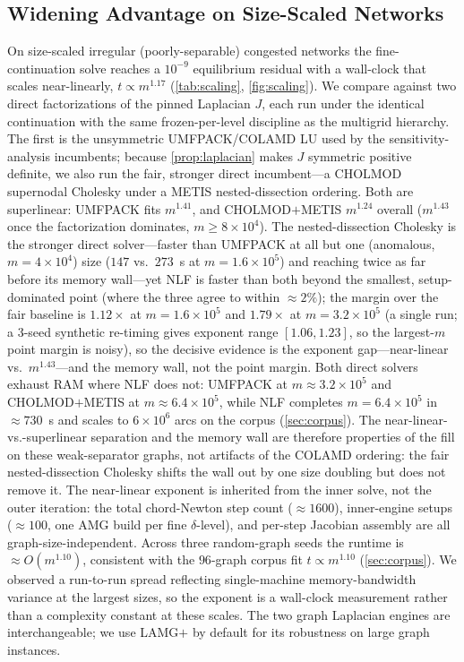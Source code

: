 \documentclass[ijoc]{informs3}
\begin{document}
\subsection{Widening Advantage on Size-Scaled Networks}
On size-scaled irregular (poorly-separable) congested networks the fine-continuation solve reaches a $10^{-9}$
equilibrium residual with a wall-clock that scales near-linearly, $t\propto m^{1.17}$ (\cref{tab:scaling},
\cref{fig:scaling}). We compare against two direct factorizations of the pinned Laplacian $J$, each run
under the identical continuation with the same frozen-per-level discipline as the multigrid hierarchy. The first
is the unsymmetric UMFPACK/COLAMD LU used by the sensitivity-analysis incumbents; because \cref{prop:laplacian}
makes $J$ symmetric positive definite, we also run the fair, stronger direct incumbent---a CHOLMOD
supernodal Cholesky under a METIS nested-dissection ordering. Both are superlinear: UMFPACK fits $m^{1.41}$, and
CHOLMOD$+$METIS $m^{1.24}$ overall ($m^{1.43}$ once the factorization dominates, $m\ge8\times10^4$). The
nested-dissection Cholesky is the stronger direct solver---faster than UMFPACK at all but one (anomalous,
$m{=}4\times10^4$) size ($147$ vs.\ $273$~s at $m{=}1.6\times10^5$) and reaching twice as far before its memory
wall---yet NLF is faster than both beyond the smallest, setup-dominated point (where the
three agree to within ${\approx}2\%$); the margin over the fair baseline is $1.12\times$ at $m{=}1.6\times10^5$ and
$1.79\times$ at $m{=}3.2\times10^5$ (a single run; a 3-seed synthetic re-timing gives exponent range $[1.06,1.23]$,
so the largest-$m$ point margin is noisy), so the decisive evidence is the exponent gap---near-linear
vs.\ $m^{1.43}$---and the memory wall, not the point margin. Both direct solvers exhaust RAM where NLF
does not: UMFPACK at $m{\approx}3.2\times10^5$ and CHOLMOD$+$METIS at $m{\approx}6.4\times10^5$, while NLF completes $m{=}6.4\times10^5$ in
${\approx}730$~s and scales to $6\times10^6$ arcs on the corpus (\cref{sec:corpus}). The near-linear-vs.-superlinear
separation and the memory wall are therefore properties of the fill on these weak-separator graphs, not artifacts
of the COLAMD ordering: the fair nested-dissection Cholesky shifts the wall out by one size doubling but does not
remove it.
The near-linear exponent is inherited from the inner solve, not the outer iteration: the total chord-Newton step count
(${\approx}1600$), inner-engine setups (${\approx}100$, one AMG build per fine $\delta$-level), and per-step Jacobian assembly are
all graph-size-independent. Across
three random-graph seeds the runtime is $\approx O(m^{1.10})$, consistent with the $96$-graph corpus fit $t\propto m^{1.10}$ (\cref{sec:corpus}). We observed a run-to-run spread reflecting single-machine memory-bandwidth variance at the largest sizes, so
the exponent is a wall-clock measurement rather than a complexity constant at these scales. The two graph Laplacian engines are
interchangeable; we use LAMG$+$ by default for its robustness on large graph instances.
\end{document}
